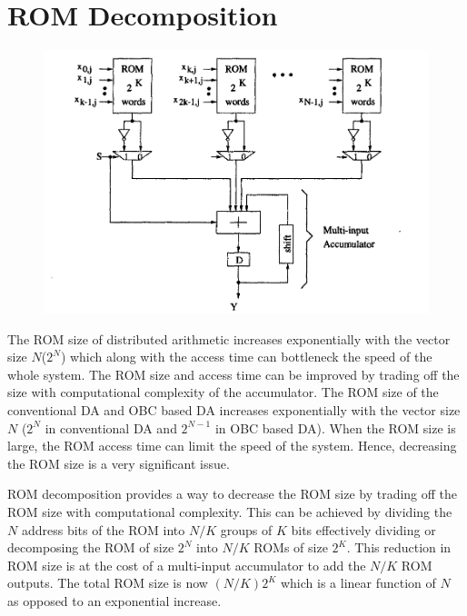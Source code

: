 \section{ROM Decomposition}
\begin{figure}[h]
\includegraphics[scale=0.4]{images/da_decom.png}
\end{figure}
The ROM size of distributed arithmetic increases exponentially with the vector size $N$($2^N$) which along with the access time can bottleneck the speed of the whole system. The ROM size and access time can be improved by trading off the size with computational complexity of the accumulator.
The ROM size of the conventional DA and OBC based DA increases exponentially with the vector size $N$ ($2^N$ in conventional DA and $2^{N-1}$ in OBC based DA). When the ROM size is large, the ROM access time can limit the speed of the system. Hence, decreasing the ROM size is a very significant issue.

ROM decomposition provides a way to decrease the ROM size by trading off the ROM size with computational complexity. This can be achieved by dividing the $N$ address bits of the ROM into $N/K$ groups of $K$ bits effectively dividing or decomposing the ROM of size $2^N$ into $N/K$ ROMs of size $2^K$. This reduction in ROM size is at the cost of a multi-input accumulator to add the $N/K$ ROM outputs.
The total ROM size is now $(N/K)2^K$ which is a linear function of $N$ as opposed to an exponential increase.



